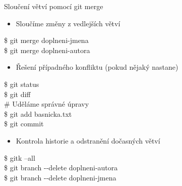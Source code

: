 \documentclass{beamer}
\begin{document}
	
\begin{frame}[fragile]{Sloučení větví pomocí git merge}
	

	\hspace{0.5cm}
	\begin{itemize}
		\item Sloučíme změny z vedlejších větví
	\end{itemize}
	
	{\ttfamily\small
		\$ git merge doplneni-jmena \\
		\$ git merge doplneni-autora
	}
	
	\hspace{0.5cm}
	\begin{itemize}
		\item Řešení případného konfliktu (pokud nějaký nastane)
	\end{itemize}
	
	{\ttfamily\small
		\$ git status \\
		\$ git diff \\
		\# Uděláme správné úpravy \\
		\$ git add basnicka.txt \\
		\$ git commit
	}
	
	\hspace{0.5cm}
	\begin{itemize}
		\item Kontrola historie a odstranění dočasných větví
	\end{itemize}
	
	{\ttfamily\small
		\$ gitk --all \\
		\$ git branch {-}{-}delete doplneni-autora \\
		\$ git branch {-}{-}delete doplneni-jmena
	}
	
\end{frame}
\end{document}

